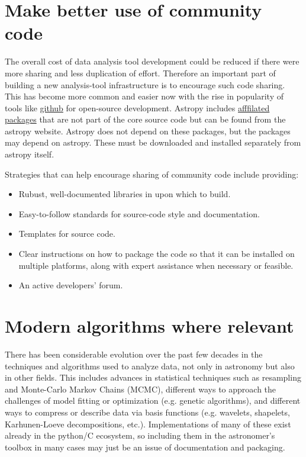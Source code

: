 \documentclass[letterpaper,10pt,english]{sphinxmanual}
\begin{document}
\section{Make better use of community code}
\label{intro:make-better-use-of-community-code}
The overall cost of data analysis tool development could be reduced
if there were more sharing and less duplication of effort. Therefore
an important part of building a new analysis-tool infrastructure is
to encourage such code sharing. This has become more common and
easier now with the rise in popularity of tools like \href{https://github.com}{github} for
open-source development.  Astropy includes
\href{http://www.astropy.org/affiliated/}{afffilated packages}
that are not part of the core source code but can be found
from the astropy website. Astropy does not depend on these packages,
but the packages may depend on astropy. These must be downloaded and
installed separately from astropy itself.

Strategies that can help encourage sharing of community code include
providing:
\begin{itemize}
\item {} 
Rubust, well-documented libraries in upon which to build.

\item {} 
Easy-to-follow standards for source-code style and documentation.

\item {} 
Templates for source code.

\item {} 
Clear instructions on how to package the code so that it can be installed on multiple platforms, along with expert assistance when necessary or feasible.

\item {} 
An active developers' forum.

\end{itemize}


\section{Modern algorithms where relevant}
\label{intro:modern-algorithms-where-relevant}
There has been considerable evolution over the past few decades
in the techniques and algorithms used to analyze data, not only in
astronomy but also in other fields. This includes advances in
statistical techniques such as resampling and Monte-Carlo
Markov Chains (MCMC), different ways  to approach the challenges
of model fitting or optimization (e.g. genetic algorithms), and
different ways to compress or describe data via basis functions
(e.g. wavelets, shapelets, Karhunen-Loeve decompositions, etc.).
Implementations of many of these exist already in the python/C
ecosystem, so including them in the astronomer's toolbox in many
cases may just be an issue of documentation and packaging.
\end{document}
